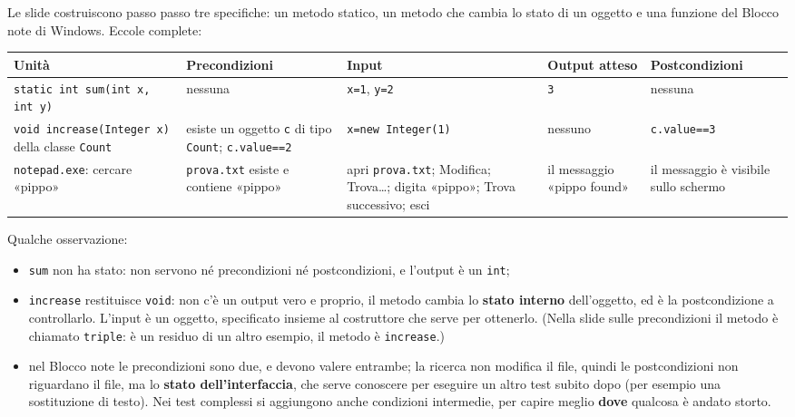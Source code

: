 Le slide costruiscono passo passo tre specifiche: un metodo statico, un metodo che cambia lo stato di un oggetto e una
funzione del Blocco note di Windows. Eccole complete:

\begin{center}
\small
\renewcommand{\arraystretch}{1.3}
\begin{tabular}{>{\raggedright\arraybackslash}p{2.6cm}>{\raggedright\arraybackslash}p{3.2cm}%
                >{\raggedright\arraybackslash}p{3.3cm}>{\raggedright\arraybackslash}p{2.3cm}%
                >{\raggedright\arraybackslash}p{2.6cm}}
  \textbf{Unità} & \textbf{Precondizioni} & \textbf{Input} & \textbf{Output atteso} & \textbf{Postcondizioni} \\ \hline
  \texttt{static int sum(int x, int y)} & nessuna & \texttt{x=1}, \texttt{y=2} & \texttt{3} & nessuna \\[2pt]
  \texttt{void increase(}\allowbreak\texttt{Integer x)} della classe \texttt{Count} & esiste un oggetto \texttt{c} di tipo \texttt{Count};
     \texttt{c.value==2} & \texttt{x=new Integer(1)} & nessuno & \texttt{c.value==3} \\[2pt]
  \texttt{notepad.exe}: cercare «pippo» & \texttt{prova.txt} esiste e contiene «pippo» & apri \texttt{prova.txt};
     Modifica; Trova\ldots; digita «pippo»; Trova successivo; esci & il messaggio «pippo found» & il messaggio è
     visibile sullo schermo \\
\end{tabular}
\end{center}

Qualche osservazione:

\begin{itemize}
  \item \texttt{sum} non ha stato: non servono né precondizioni né postcondizioni, e l'output è un \texttt{int};
  \item \texttt{increase} restituisce \texttt{void}: non c'è un output vero e proprio, il metodo cambia lo
        \textbf{stato interno} dell'oggetto, ed è la postcondizione a controllarlo. L'input è un oggetto, specificato
        insieme al costruttore che serve per ottenerlo. (Nella slide sulle precondizioni il metodo è chiamato
        \texttt{triple}: è un residuo di un altro esempio, il metodo è \texttt{increase}.)
  \item nel Blocco note le precondizioni sono due, e devono valere entrambe; la ricerca non modifica il file, quindi le
        postcondizioni non riguardano il file, ma lo \textbf{stato dell'interfaccia}, che serve conoscere per eseguire
        un altro test subito dopo (per esempio una sostituzione di testo). Nei test complessi si aggiungono anche
        condizioni intermedie, per capire meglio \textbf{dove} qualcosa è andato storto.
\end{itemize}


